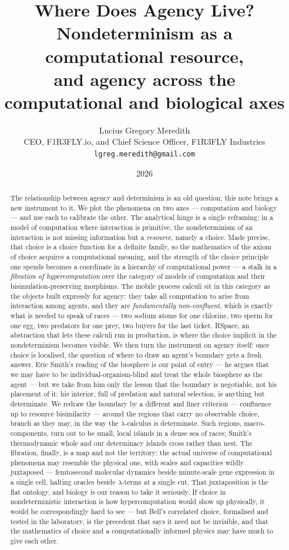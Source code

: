 \documentclass[11pt]{article}
\title{\bfseries Where Does Agency Live?\\[3pt]
\large Nondeterminism as a computational resource,\\
and agency across the computational and biological axes}
\author{Lucius Gregory Meredith\\
\small CEO, F1R3FLY.io, and Chief Science Officer, F1R3FLY Industries\\
\small \texttt{lgreg.meredith@gmail.com}}
\date{2026}
\theoremstyle{definition}
\theoremstyle{plain}
\theoremstyle{remark}
\begin{document}
\maketitle

\begin{abstract}
The relationship between agency and determinism is an old question; this note
brings a new instrument to it. We plot the phenomena on two axes ---
computation and biology --- and use each to calibrate the other. The
analytical hinge is a single reframing: in a model of computation where
interaction is primitive, the nondeterminism of an interaction is not missing
information but a \emph{resource}, namely a choice. Made precise, that choice
is a choice function for a definite family, so the mathematics of the axiom of
choice acquires a computational meaning, and the strength of the choice
principle one spends becomes a coordinate in a hierarchy of computational
power --- a stalk in a \emph{fibration of hypercomputation} over the category
of models of computation and their bisimulation-preserving morphisms. The
mobile process calculi sit in this category as the objects built expressly for
agency: they take all computation to arise from interaction among agents, and
they are \emph{fundamentally non-confluent}, which is exactly what is needed to
speak of races --- two sodium atoms for one chlorine, two sperm for one egg,
two predators for one prey, two buyers for the last ticket. RSpace, an
abstraction that lets these calculi run in production, is where the choice
implicit in the nondeterminism becomes visible. We then turn the instrument on
agency itself: once choice is localised, the question of where to draw an agent's
boundary gets a fresh answer. Eric Smith's reading of the biosphere is our point
of entry --- he argues that we may have to be individual-organism-blind and treat
the whole biosphere as the agent --- but we take from him only the lesson that the
boundary is negotiable, not his placement of it: his interior, full of predation
and natural selection, is anything but determinate. We redraw the boundary by a
different and finer criterion --- confluence up to resource bisimilarity ---
around the regions that carry no observable choice, branch as they may, in the way
the $\lambda$-calculus is determinate. Such regions, macro-components, turn out to
be small, local islands in a dense sea of races; Smith's thermodynamic whole and
our determinacy islands cross rather than nest. The
fibration, finally, is a map and not the territory: the actual universe of
computational phenomena may resemble the physical one, with scales and capacities
wildly juxtaposed --- femtosecond molecular dynamics beside minute-scale gene
expression in a single cell, halting oracles beside $\lambda$-terms at a single
cut. That juxtaposition is the flat ontology, and biology is our reason to take
it seriously. If choice in nondeterministic interaction is how hypercomputation
would show up physically, it would be correspondingly hard to see --- but Bell's
correlated choice, formalised and tested in the laboratory, is the precedent that
says it need not be invisible, and that the mathematics of choice and a
computationally informed physics may have much to give each other.
\end{abstract}
\end{document}
